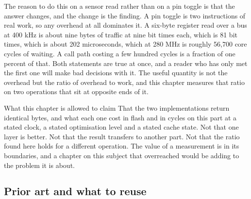 The reason to do this on a sensor read rather than on a pin toggle is that the
answer changes, and the change is the finding. A pin toggle is two instructions
of real work, so any overhead at all dominates it. A six-byte register read over
a bus at 400 kHz is about nine bytes of traffic at nine bit times each, which is
81 bit times, which is about 202 microseconds, which at 280 MHz is roughly
56,700 core cycles of waiting. A call path costing a few hundred cycles is a
fraction of one percent of that. Both statements are true at once, and a reader
who has only met the first one will make bad decisions with it. The useful
quantity is not the overhead but the ratio of overhead to work, and this chapter
measures that ratio on two operations that sit at opposite ends of it.

\begin{note}{What this chapter is allowed to claim}
That the two implementations return identical bytes, and what each one cost in
flash and in cycles on this part at a stated clock, a stated optimisation level
and a stated cache state. Not that one layer is better. Not that the result
transfers to another part. Not that the ratio found here holds for a different
operation. The value of a measurement is in its boundaries, and a chapter on
this subject that overreached would be adding to the problem it is about.
\end{note}

\subsection*{Prior art and what to reuse}

